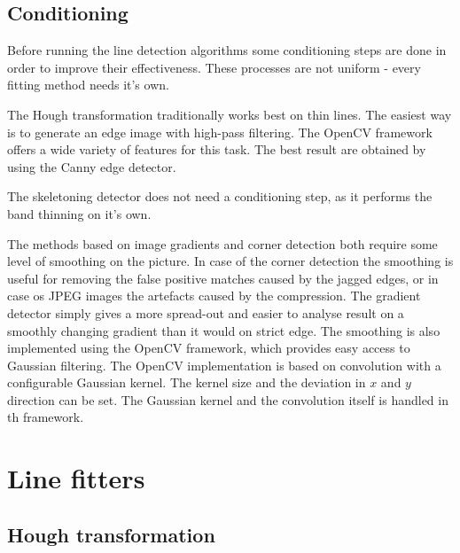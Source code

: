 \subsection{Conditioning}

Before running the line detection algorithms some conditioning steps are done in order to improve their effectiveness.
These processes are not uniform - every fitting method needs it's own.

The Hough transformation traditionally works best on thin lines.
The easiest way is to generate an edge image with high-pass filtering.
The OpenCV framework offers a wide variety of features for this task.
The best result are obtained by using the Canny edge detector.

The skeletoning detector does not need a conditioning step, as it performs the band thinning on it's own.

The methods based on image gradients and corner detection both require some level of smoothing on the picture.
In case of the corner detection the smoothing is useful for removing the false positive matches caused by the jagged edges, or in case os JPEG images the artefacts caused by the compression.
The gradient detector simply gives a more spread-out and easier to analyse result on a smoothly changing gradient than it would on strict edge.
The smoothing is also implemented using the OpenCV framework, which provides easy access to Gaussian filtering.
The OpenCV implementation is based on convolution with a configurable Gaussian kernel.
The kernel size and the deviation in $x$ and $y$ direction can be set.
The Gaussian kernel and the convolution itself is handled in th framework.

\section{Line fitters}



\subsection{Hough transformation}




